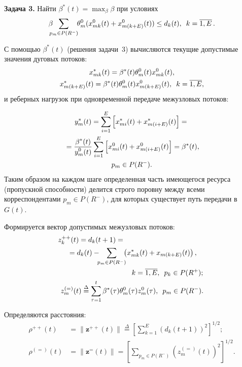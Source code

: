 \begin{multicols}{2}
\smallskip

\noindent
\textbf{Задача 3.} Найти $\beta^*(t)=\max\nolimits_\beta \beta$ при
условиях
$$
\beta\!\!\!\!\sum\limits_{p_m\in P(R^-)}\!\!
\theta_m^0(x_{mk}^0(t)+x_{m(k+E)}^0(t))\le d_k(t),\enskip
k=\overline{1,E}\,.
$$

 С помощью $\beta^*(t)$ (решения задачи~3) вычисляются текущие допустимые значения дуговых потоков:
\begin{multline*}
x_{mk}^*(t)=\beta^*(t)\theta^0_m(t)x^0_{mk}(t),\\
x^*_{m(k+E)}(t)=\beta^*(t)\theta^0_m(t)x^0_{m(k+E)}(t), \enskip
k=\overline{1,E},
\end{multline*}
и реберных нагрузок при одновременной передаче межузловых потоков:

\noindent
\begin{multline*}
y_m^*(t)=\sum\limits_{i=1}^E
\left[x_{mi}^*(t)+x^*_{m(i+E)}(t)\right]={}\\
{}= \displaystyle\frac{\displaystyle \beta^*(t)\mathstrut}{\displaystyle y_m^0(t)\mathstrut} \sum\limits_{i=1}^E
\left[x_{mi}^0(t)+x^0_{m(i+E)}(t)\right]=\beta^*(t), \\
 p_m\in P(R^-).
\end{multline*}
Таким образом на каждом шаге определенная часть имеющегося ресурса
(пропускной спо\-соб\-ности) делится строго по\-ров\-ну меж\-ду всеми
корреспондентами $p_m\in P(R^-)$, для которых существует путь
передачи в~$G(t)$.

Формируется вектор допустимых межузловых потоков:
\begin{gather*}
\hspace*{-30mm}z_k^{++}(t)=d_k(t+1)={}\hspace*{10mm}\\
{}=d_k(t)-\!\!\! \sum\limits_{p_m\in P(R^-)}\!\!\!
\left(x_{mk}^*(t)+x_{m(k+E)}(t)\right),\\
\hspace*{35mm}k=\overline{1,E}, \enskip
p_k\in P(R^+);\\
z_m^{(=)}(t)\overset{\Delta}{=}\sum\limits_{\tau=1}^t\beta^*(\tau)
\theta_m^0(\tau) z_m^0(\tau), \enskip p_m\in P(R^-).
\end{gather*}

\noindent
Определяются расстояния:
\begin{align*}
\rho^{++}(t)&=\|\mathbf{z}^{++}(t)\|\overset{\Delta}{=}
\left[\sum\limits_{k=1}^E\left(d_k(t+1)\right)^2\right]^{1/2};\\
\rho^{(=)}(t)&=\|\mathbf{z}^{=}(t)\|= \left[\sum\limits_{p_m\in
P(R^-)}\left(z_m^{(=)}(t)\right)^2\right]^{1/2}.
\end{align*}


\end{multicols}
